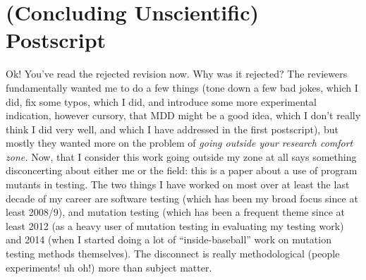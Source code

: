\documentclass[sigplan,screen]{acmart}
\begin{document}
\section{(Concluding Unscientific) Postscript}

Ok!  You've read the rejected revision now.  Why was it rejected?  The
reviewers fundamentally wanted me to do a few things (tone down a few
bad jokes, which I did, fix some typos, which I did, and introduce
some more experimental indication, however cursory, that MDD might be
a good idea, which I don't really think I did very well, and which I
have addressed in the first postscript), but mostly they wanted
more on the problem of \emph{going outside your research comfort
  zone.}  Now, that I consider this work going outside my zone at all
says something disconcerting about either me or the field:  this is a
paper about a use of program mutants in testing.  The two things I
have worked on most over at least the last decade of my career are
software testing (which has been my broad focus since at least 2008/9), and
mutation testing (which has been a frequent theme since at least 2012
(as a heavy user of mutation testing in evaluating my testing work)
and 2014 (when I started doing a lot of ``inside-baseball'' work on
mutation testing methods themselves).  The disconnect is really
methodological (people experiments!  uh oh!) more than subject matter.
\end{document}

